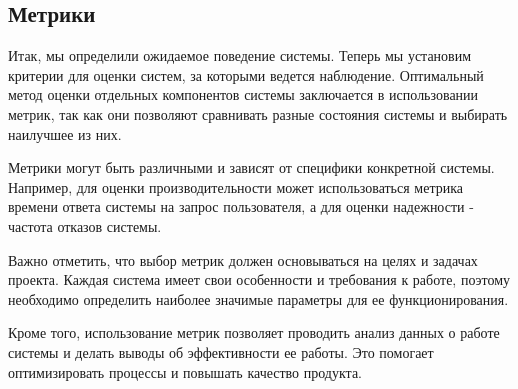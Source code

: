\subsection{Метрики}
Итак, мы определили ожидаемое поведение системы. Теперь мы установим критерии для оценки систем, за которыми ведется наблюдение. Оптимальный метод оценки отдельных компонентов системы заключается в использовании метрик, так как они позволяют сравнивать разные состояния системы и выбирать наилучшее из них.

Метрики могут быть различными и зависят от специфики конкретной системы. Например, для оценки производительности может использоваться метрика времени ответа системы на запрос пользователя, а для оценки надежности - частота отказов системы.

Важно отметить, что выбор метрик должен основываться на целях и задачах проекта. Каждая система имеет свои особенности и требования к работе, поэтому необходимо определить наиболее значимые параметры для ее функционирования.

Кроме того, использование метрик позволяет проводить анализ данных о работе системы и делать выводы об эффективности ее работы. Это помогает оптимизировать процессы и повышать качество продукта.
